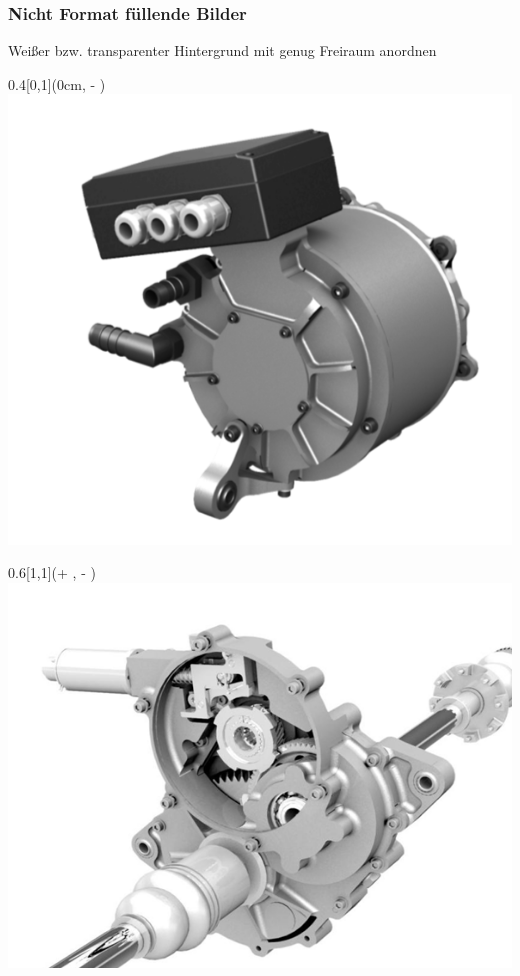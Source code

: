 \begin{frame}
    \frametitle{Nicht Format füllende Bilder}
    
    Weißer bzw. transparenter Hintergrund\newline
    mit genug Freiraum anordnen


\begin{textblock*}{0.4\paperwidth}[0,1](0cm, \textheight - \PraesentationSeitenrand)%
\includegraphics[width=0.4\paperwidth]{./Ressourcen/Praesentation/Bilder/Motor.png}
\end{textblock*}

\begin{textblock*}{0.6\paperwidth}[1,1](\textwidth + \PraesentationSeitenrand, \textheight - \PraesentationSeitenrand)%
\includegraphics[width=0.6\paperwidth]{./Ressourcen/Praesentation/Bilder/Getriebe.png}
\end{textblock*}

\end{frame}
\clearpage


